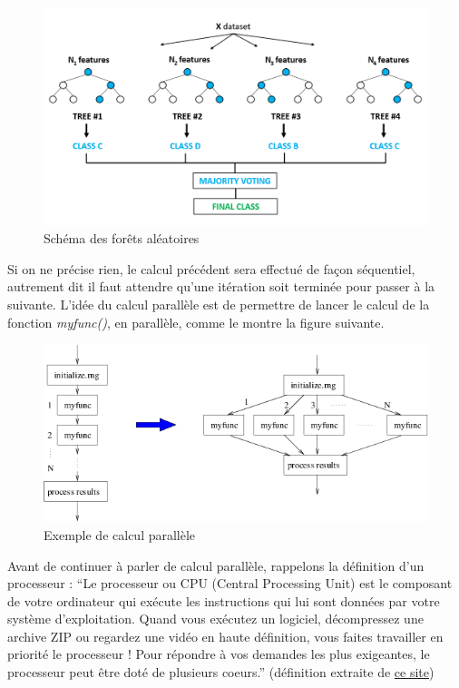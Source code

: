 \documentclass[
]{book}
\theoremstyle{definition}
\theoremstyle{definition}
\theoremstyle{definition}
\theoremstyle{definition}
\theoremstyle{remark}
\begin{document}
\begin{figure}
\centering
\includegraphics{Figures/rf.png}
\caption{Schéma des forêts aléatoires}
\end{figure}

Si on ne précise rien, le calcul précédent sera effectué de façon séquentiel, autrement dit il faut attendre qu'une itération soit terminée pour passer à la suivante. L'idée du calcul parallèle est de permettre de lancer le calcul de la fonction \emph{myfunc()}, en parallèle, comme le montre la figure suivante.

\begin{figure}
\centering
\includegraphics{Figures/Figure1.png}
\caption{Exemple de calcul parallèle}
\end{figure}

Avant de continuer à parler de calcul parallèle, rappelons la définition d'un processeur : ``Le processeur ou CPU (Central Processing Unit) est le composant de votre ordinateur qui exécute les instructions qui lui sont données par votre système d'exploitation. Quand vous exécutez un logiciel, décompressez une archive ZIP ou regardez une vidéo en haute définition, vous faites travailler en priorité le processeur ! Pour répondre à vos demandes les plus exigeantes, le processeur peut être doté de plusieurs coeurs.'' (définition extraite de \href{https://lecrabeinfo.net/le-role-des-processeurs-et-de-leurs-coeurs.html}{ce site})
\end{document}
